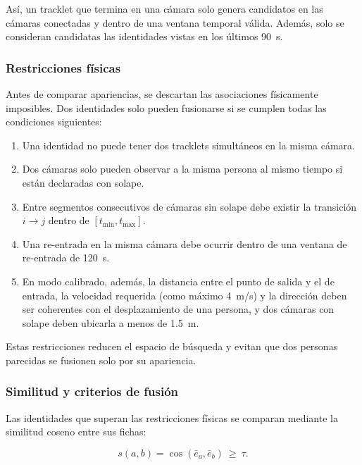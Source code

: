 \documentclass[12pt,letterpaper]{article}
\begin{document}
Así, un tracklet que termina en una cámara solo genera candidatos en las
cámaras conectadas y dentro de una ventana temporal válida. Además, solo
se consideran candidatas las identidades vistas en los últimos 90~s.

\subsubsection{Restricciones físicas}

Antes de comparar apariencias, se descartan las asociaciones físicamente
imposibles. Dos identidades solo pueden fusionarse si se cumplen todas
las condiciones siguientes:

\begin{enumerate}
    \item Una identidad no puede tener dos tracklets simultáneos en la
    misma cámara.
    \item Dos cámaras solo pueden observar a la misma persona al mismo
    tiempo si están declaradas con solape.
    \item Entre segmentos consecutivos de cámaras sin solape debe existir
    la transición $i\rightarrow j$ dentro de $[t_{\min},t_{\max}]$.
    \item Una re-entrada en la misma cámara debe ocurrir dentro de una
    ventana de re-entrada de 120~s.
    \item En modo calibrado, además, la distancia entre el punto de
    salida y el de entrada, la velocidad requerida (como máximo
    4~m/s) y la dirección deben ser coherentes con el desplazamiento de
    una persona, y dos cámaras con solape deben ubicarla a menos de
    1.5~m.
\end{enumerate}

Estas restricciones reducen el espacio de búsqueda y evitan que dos
personas parecidas se fusionen solo por su apariencia.

\subsubsection{Similitud y criterios de fusión}

Las identidades que superan las restricciones físicas se comparan
mediante la similitud coseno entre sus fichas:

\begin{equation}
s(a,b)=\cos\!\left(\bar{e}_a,\bar{e}_b\right)\ \geq\ \tau .
\end{equation}
\end{document}

